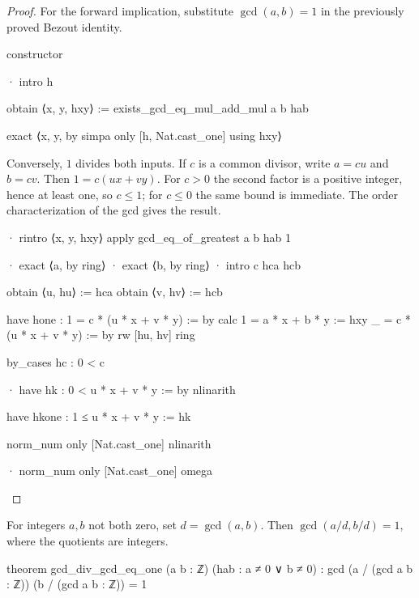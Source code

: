 \begin{proof}
  For the forward implication, substitute $\gcd(a,b)=1$ in the previously proved Bezout identity.

  \begin{lean}
    constructor

    · intro h

      obtain ⟨x, y, hxy⟩ := exists_gcd_eq_mul_add_mul a b hab

      exact ⟨x, y, by simpa only [h, Nat.cast_one] using hxy⟩
  \end{lean}
  Conversely, $1$ divides both inputs. If $c$ is a common divisor, write $a=cu$ and $b=cv$. Then $1=c(ux+vy)$. For $c>0$ the second factor is a positive integer, hence at least one, so $c\le1$; for $c\le0$ the same bound is immediate. The order characterization of the gcd gives the result.

  \begin{lean}
    · rintro ⟨x, y, hxy⟩
      apply gcd_eq_of_greatest a b hab 1

      · exact ⟨a, by ring⟩
      · exact ⟨b, by ring⟩
      · intro c hca hcb

        obtain ⟨u, hu⟩ := hca
        obtain ⟨v, hv⟩ := hcb

        have hone : 1 = c * (u * x + v * y) := by
          calc
            1 = a * x + b * y := hxy
            _ = c * (u * x + v * y) := by
              rw [hu, hv]
              ring

        by_cases hc : 0 < c

        · have hk : 0 < u * x + v * y := by
            nlinarith

          have hkone : 1 ≤ u * x + v * y := hk

          norm_num only [Nat.cast_one]
          nlinarith

        · norm_num only [Nat.cast_one]
          omega
  \end{lean}
\end{proof}

\begin{corollary} \label{nt:thm:gcd-div-gcd}
  For integers $a,b$ not both zero, set $d=\gcd(a,b)$. Then $\gcd(a/d,b/d)=1$, where the quotients are integers.

  \begin{lean}
    theorem gcd_div_gcd_eq_one (a b : ℤ) (hab : a ≠ 0 ∨ b ≠ 0) :
        gcd (a / (gcd a b : ℤ)) (b / (gcd a b : ℤ)) = 1
  \end{lean}
\end{corollary}


